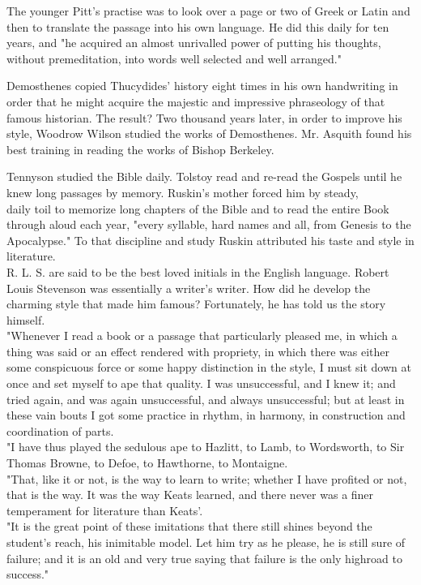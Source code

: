 \documentclass[10pt]{article}
\begin{document}
The younger Pitt's practise was to look over a page or two of Greek or Latin and then to translate the passage into his own language. He did this daily for ten years, and "he acquired an almost unrivalled power of putting his thoughts, without premeditation, into words well selected and well arranged."

Demosthenes copied Thucydides' history eight times in his own handwriting in order that he might acquire the majestic and impressive phraseology of that famous historian. The result? Two thousand years later, in order to improve his style, Woodrow Wilson studied the works of Demosthenes. Mr. Asquith found his best training in reading the works of Bishop Berkeley.

Tennyson studied the Bible daily. Tolstoy read and re-read the Gospels until he knew long passages by memory. Ruskin's mother forced him by steady,\\
daily toil to memorize long chapters of the Bible and to read the entire Book through aloud each year, "every syllable, hard names and all, from Genesis to the Apocalypse." To that discipline and study Ruskin attributed his taste and style in literature.\\
R. L. S. are said to be the best loved initials in the English language. Robert Louis Stevenson was essentially a writer's writer. How did he develop the charming style that made him famous? Fortunately, he has told us the story himself.\\
"Whenever I read a book or a passage that particularly pleased me, in which a thing was said or an effect rendered with propriety, in which there was either some conspicuous force or some happy distinction in the style, I must sit down at once and set myself to ape that quality. I was unsuccessful, and I knew it; and tried again, and was again unsuccessful, and always unsuccessful; but at least in these vain bouts I got some practice in rhythm, in harmony, in construction and coordination of parts.\\
"I have thus played the sedulous ape to Hazlitt, to Lamb, to Wordsworth, to Sir Thomas Browne, to Defoe, to Hawthorne, to Montaigne.\\
"That, like it or not, is the way to learn to write; whether I have profited or not, that is the way. It was the way Keats learned, and there never was a finer temperament for literature than Keats'.\\
"It is the great point of these imitations that there still shines beyond the student's reach, his inimitable model. Let him try as he please, he is still sure of failure; and it is an old and very true saying that failure is the only highroad to success."
\end{document}
